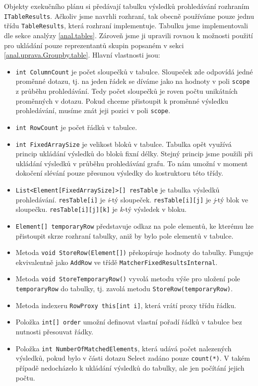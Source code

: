Objekty exekučního plánu si předávají tabulku výsledků prohledávání rozhraním \texttt{ITableResults}.
Ačkoliv jsme navrhli rozhraní, tak obecně používáme pouze jednu třídu \texttt{TableResults}, která rozhraní implementuje.
Tabulku jsme implementovali dle sekce analýzy \ref{anal.tables}.
Zároveň jsme ji upravili rovnou k možnosti použití pro ukládání pouze reprezentantů skupin popsaném v sekci \ref{anal.uprava.Groupby.table}.
Hlavní vlastnosti jsou:
\begin{itemize}
\item \texttt{int ColumnCount} je počet sloupečků v tabulce.
Sloupeček zde odpovídá jedné proměnné dotazu, tj. na jeden řádek se díváme jako na hodnoty v poli \texttt{scope} z průběhu prohledávání.
Tedy počet sloupečků je roven počtu unikátních proměnných v dotazu.
Pokud chceme přistoupit k proměnné výsledku prohledávání, musíme znát jeji pozici v poli \texttt{scope}.

\item \texttt{int RowCount} je počet řádků v tabulce.
\item \texttt{int FixedArraySize} je velikost bloků v tabulce.
Tabulka opět využívá princip ukládání výsledků do bloků fixní délky.
Stejný princip jsme použili při ukládání výsledků v průběhu prohledávání grafu.
To nám umožní v moment dokočení slévání pouze přesunou výsledky do kostruktoru této třídy.
\item \texttt{List<Element[FixedArraySize]>[] resTable} je tabulka výsledků prohledávání.
\texttt{resTable[i]} je \textit{i}-tý sloupeček.
\texttt{resTable[i][j]} je \textit{j}-tý blok ve sloupečku.
\texttt{resTable[i][j][k]} je \textit{k}-tý výsledek v bloku.
\item \texttt{Element[] temporaryRow} představuje odkaz na pole elementů, ke kterému lze přistoupit skrze rozhraní tabulky, aniž by bylo pole elementů v tabulce.
\item Metoda \texttt{void StoreRow(Element[])} překopíruje hodnoty do tabulky. Funguje ekvivalentně jako \texttt{AddRow} ve třídě \texttt{MatcherFixedResultsInternal}.
\item Metoda \texttt{void StoreTemporaryRow()} vyvolá metodu výše pro uložení pole \texttt{temporaryRow} do tabulky, tj. zavolá metodu \texttt{StoreRow(temporaryRow)}.
\item Metoda indexeru \texttt{RowProxy this[int i]}, která vrátí proxy třídu řádku.
\item Položka \texttt{int[] order} umožní definovat vlastní pořadí řádků v tabulce bez nutnosti přesouvat řádky.
\item Položka \texttt{int NumberOfMatchedElements}, která udává počet nalezených výsledků, pokud bylo v části dotazu Select zadáno pouze \texttt{count(*)}.
V takém případě nedocházelo k ukládání výsledků do tabulky, ale jen počítání jejich počtu.

\end{itemize}
